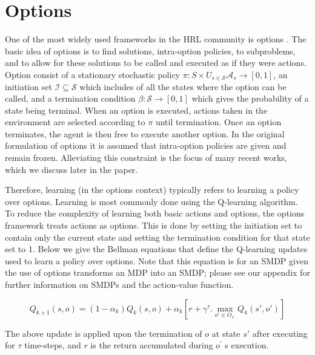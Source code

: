 \section{Options}
One of the most widely used frameworks in the HRL community is options \cite{Sutton}.
The basic idea of options is to find solutions, intra-option policies, to subproblems, and to allow
for these solutions to be called and executed as if they were actions.
Option consist of a stationary stochastic policy \(\pi:S \times U_{s \in \mathcal{S}}  \mathcal{A}_s \rightarrow [0,1]\),
an initiation set \(\mathcal{I} \subseteq  \mathcal{S}\) which includes of all the states where the option can be called,
and a termination condition \(\beta:\mathcal{S} \rightarrow [0,1]\) which gives the probability of a state being terminal.
When an option is executed, actions taken in the environment are selected according to \(\pi\) until termination.
Once an option terminates, the agent is then free to execute another option. In the original formulation of options it
is assumed that intra-option policies are given and remain frozen. Alleviating this constraint is the focus of many
recent works, which we discuss later in the paper.

Therefore, learning (in the options context) typically refers to learning a policy over options.
Learning is most commonly done using the Q-learning algorithm. To reduce the complexity of learning
both basic actions and options, the options framework treats actions as options. This is done by
setting the initiation set to contain only the current state and setting the termination condition
for that state set to 1. Below we give the Bellman equations that define the Q-learning updates
used to learn a policy over options. Note that this equation is for an SMDP given the use of options
transforms an MDP into an SMDP; please see our appendix for further information on SMDPs and the
action-value function.

\begin{equation}
    Q_{k+1} (s,o)=(1-\alpha_k ) Q_k (s,o)+\alpha_k [r+ \gamma^\tau.   \max_{o' \in O_{s'}}⁡ Q_k (s',o' )]
\end{equation}

The above update is applied upon the termination of \(o\) at state \(s'\)
after executing for \(\tau\) time-steps, and \(r\) is the return accumulated during \(o^'\) s execution.  \\
